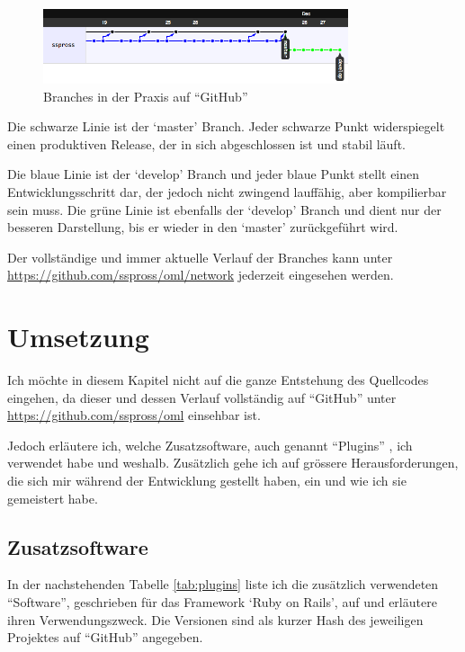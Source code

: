 \begin{figure}[ht]
    \begin{center}
        \includegraphics[width=0.8\textwidth,angle=0]{./bilder/network_01.png}
        \caption{Branches in der Praxis auf ``GitHub''}
        \label{network_01}
    \end{center}
\end{figure}

Die schwarze Linie ist der `master' Branch. Jeder schwarze Punkt widerspiegelt
einen produktiven Release, der in sich abgeschlossen ist und stabil läuft.

Die blaue Linie ist der `develop' Branch und jeder blaue Punkt stellt einen
Entwicklungsschritt dar, der jedoch nicht zwingend lauffähig, aber kompilierbar 
sein muss. Die grüne Linie ist ebenfalls der `develop' Branch und dient nur
der besseren Darstellung, bis er wieder in den `master' zurückgeführt wird.

Der vollständige und immer aktuelle Verlauf der Branches kann unter 
\url{https://github.com/sspross/oml/network} jederzeit eingesehen werden.

\section{Umsetzung}
Ich möchte in diesem Kapitel nicht auf die ganze Entstehung des Quellcodes 
eingehen, da dieser und dessen Verlauf vollständig auf ``GitHub'' unter
\url{https://github.com/sspross/oml} einsehbar ist.

Jedoch erläutere ich, welche Zusatzsoftware, auch genannt ``Plugins'' \cite{plugin}, ich 
verwendet habe und weshalb. Zusätzlich gehe ich auf grössere Herausforderungen,
die sich mir während der Entwicklung gestellt haben, ein und wie ich sie
gemeistert habe.

\subsection{Zusatzsoftware}
In der nachstehenden Tabelle \ref{tab:plugins} liste ich die zusätzlich verwendeten
``Software'', geschrieben für das Framework `Ruby on Rails', auf und erläutere
ihren Verwendungszweck. Die Versionen sind als kurzer Hash \cite{hash} des
jeweiligen Projektes auf ``GitHub'' angegeben.

